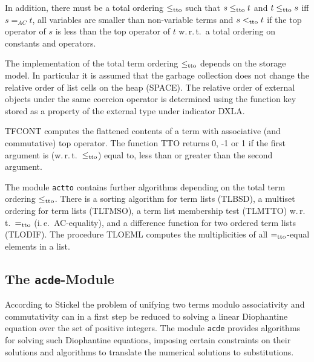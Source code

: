 In addition, there must be a total ordering $\leq_{\mbox{\scriptsize tto}}$
such that \( s \leq_{\mbox{\scriptsize tto}} t \) and
\( t \leq_{\mbox{\scriptsize tto}} s \) iff \( s =_{AC} t \),
all variables are smaller than non-variable terms and
\( s <_{\mbox{\scriptsize tto}} t \) if the top operator of $s$ is less than
the
top operator of $t$ w.\,r.\,t.\ a total ordering on constants and operators.

The implementation of the total term ordering $\leq_{\mbox{\scriptsize tto}}$
depends on the storage model.
In particular it is assumed that the garbage collection 
does not change the relative order of list cells on the heap (SPACE).
The relative order of external objects under the same coercion operator 
is determined using the function key stored as a property of the external type
under indicator DXLA.

TFCONT computes the flattened contents of a term with associative
(and commutative) top operator.
The function TTO returns 0, -1 or 1 if the first argument is (w.\,r.\,t.\
$\leq_{\mbox{\scriptsize tto}}$) equal to, less than or greater than the
second argument.

The module {\tt actto} contains further algorithms depending on the total
term ordering $\leq_{\mbox{\scriptsize tto}}$.
There is a sorting algorithm for term lists (TLBSD), a multiset ordering
for term lists (TLTMSO), a term list membership test (TLMTTO) w.\,r.\,t.\ 
$=_{\mbox{\scriptsize tto}}$ (i.\,e.\ AC-equality),
and a difference function for two ordered term lists (TLODIF).
The procedure TLOEML computes the multiplicities of all 
$=_{\mbox{\scriptsize tto}}$-equal elements in a list.

\subsection{The {\tt acde}-Module}

According to Stickel \cite{Stickel:81} the problem of unifying two terms
modulo associativity and commutativity can in a first step be reduced to
solving a linear Diophantine equation over the set of positive
\index{equation!linear Diophantine}
integers.
The module {\tt acde} provides algorithms for solving such Diophantine
equations, imposing certain constraints on their solutions and
algorithms to translate the numerical solutions to substitutions.

